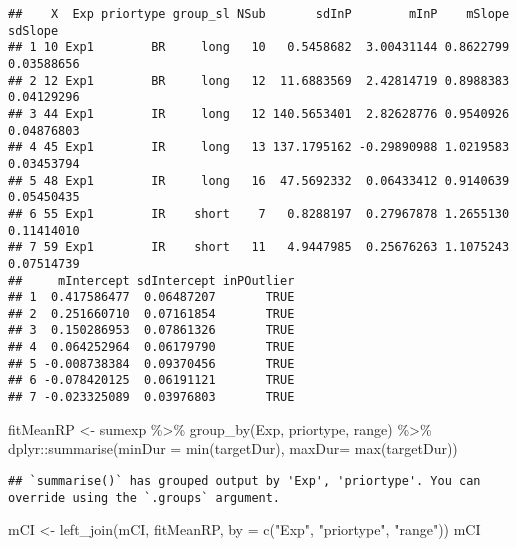 \documentclass[
]{article}
\newenvironment{Shaded}{\begin{snugshade}}{\end{snugshade}}
\newcommand{\AttributeTok}[1]{\textcolor[rgb]{0.77,0.63,0.00}{#1}}
\newcommand{\FunctionTok}[1]{\textcolor[rgb]{0.00,0.00,0.00}{#1}}
\newcommand{\NormalTok}[1]{#1}
\newcommand{\OtherTok}[1]{\textcolor[rgb]{0.56,0.35,0.01}{#1}}
\newcommand{\SpecialCharTok}[1]{\textcolor[rgb]{0.00,0.00,0.00}{#1}}
\newcommand{\StringTok}[1]{\textcolor[rgb]{0.31,0.60,0.02}{#1}}
\begin{document}
\begin{verbatim}
##    X  Exp priortype group_sl NSub       sdInP        mInP    mSlope    sdSlope
## 1 10 Exp1        BR     long   10   0.5458682  3.00431144 0.8622799 0.03588656
## 2 12 Exp1        BR     long   12  11.6883569  2.42814719 0.8988383 0.04129296
## 3 44 Exp1        IR     long   12 140.5653401  2.82628776 0.9540926 0.04876803
## 4 45 Exp1        IR     long   13 137.1795162 -0.29890988 1.0219583 0.03453794
## 5 48 Exp1        IR     long   16  47.5692332  0.06433412 0.9140639 0.05450435
## 6 55 Exp1        IR    short    7   0.8288197  0.27967878 1.2655130 0.11414010
## 7 59 Exp1        IR    short   11   4.9447985  0.25676263 1.1075243 0.07514739
##     mIntercept sdIntercept inPOutlier
## 1  0.417586477  0.06487207       TRUE
## 2  0.251660710  0.07161854       TRUE
## 3  0.150286953  0.07861326       TRUE
## 4  0.064252964  0.06179790       TRUE
## 5 -0.008738384  0.09370456       TRUE
## 6 -0.078420125  0.06191121       TRUE
## 7 -0.023325089  0.03976803       TRUE
\end{verbatim}

\begin{Shaded}
\begin{Highlighting}[]
\NormalTok{fitMeanRP }\OtherTok{\textless{}{-}}\NormalTok{ sumexp }\SpecialCharTok{\%\textgreater{}\%} \FunctionTok{group\_by}\NormalTok{(Exp, priortype, range) }\SpecialCharTok{\%\textgreater{}\%}
\NormalTok{  dplyr}\SpecialCharTok{::}\FunctionTok{summarise}\NormalTok{(}\AttributeTok{minDur =} \FunctionTok{min}\NormalTok{(targetDur),}
                   \AttributeTok{maxDur=} \FunctionTok{max}\NormalTok{(targetDur))}
\end{Highlighting}
\end{Shaded}

\begin{verbatim}
## `summarise()` has grouped output by 'Exp', 'priortype'. You can override using the `.groups` argument.
\end{verbatim}

\begin{Shaded}
\begin{Highlighting}[]
\NormalTok{mCI }\OtherTok{\textless{}{-}} \FunctionTok{left\_join}\NormalTok{(mCI, fitMeanRP, }\AttributeTok{by =} \FunctionTok{c}\NormalTok{(}\StringTok{"Exp"}\NormalTok{, }\StringTok{"priortype"}\NormalTok{, }\StringTok{"range"}\NormalTok{))}
\NormalTok{mCI}
\end{Highlighting}
\end{Shaded}
\end{document}
